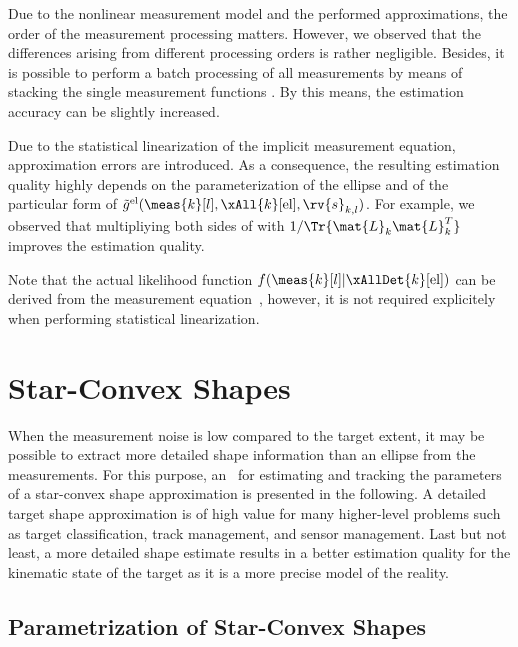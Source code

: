 \documentclass[preprint,1p,11pt]{ISAS_IR}
\begin{document}
\begin{Remark}\label{rem:order}
 Due to the nonlinear measurement model and the performed approximations, the order of the measurement processing matters. However, we observed that the differences arising from different processing orders is rather negligible.
  Besides, it is possible to perform a batch processing of all measurements by means of stacking the single measurement functions . By this means, the estimation accuracy can be slightly increased.
\end{Remark}
\begin{Remark}\label{rem:approx_error}
Due to the statistical linearization of the implicit measurement equation, approximation errors are introduced. As a consequence, the resulting estimation quality highly  depends on the
parameterization of the ellipse and of the particular form of $\tilde{g}^{\text{el}}(\meas{k}[l], \xAll{k}[\text{el}],   \rv{s}_{k,l})$.
For example, we observed that multipliying both sides of   with $1/\Tr{\mat{L}_k  \mat{L}_k^T}$ improves the estimation quality.
 \end{Remark}
\begin{Remark}
Note that the  actual likelihood function  $f(\meas{k}[l]| \xAllDet{k}[\text{el}]) $  can be derived from  the measurement equation~, however, it is not required explicitely when performing statistical linearization.
\end{Remark}


\chapter{Star-Convex Shapes}\label{sec:rhm_starconvex}
When the measurement noise is low compared to the target extent, it may be 
possible to extract more detailed shape information than an ellipse from the measurements. 
For this purpose, an \rhm\ for estimating and tracking the parameters of a star-convex  shape approximation is presented in the following. A detailed target shape approximation is of high value for many higher-level problems such as target classification,
track management, and  sensor management. Last but not least, a more detailed shape estimate results in a better estimation quality for the kinematic state of the target as it is a more precise model of the reality.


\section{Parametrization of Star-Convex Shapes} 
\end{document}
